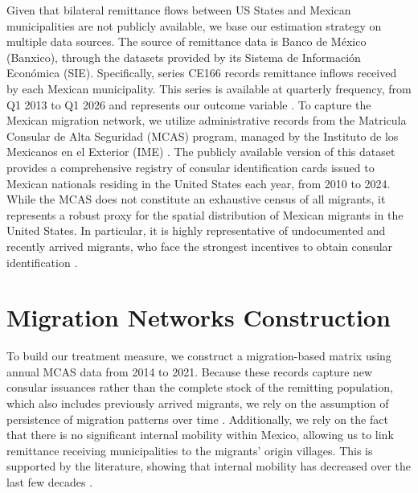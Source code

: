 Given that bilateral remittance flows between US States and Mexican municipalities are not publicly available, we base our estimation strategy on multiple data sources. The source of remittance data is Banco de México (Banxico), through the datasets provided by its Sistema de Información Económica (SIE). Specifically, series CE166 records remittance inflows received by each Mexican municipality. This series is available at quarterly frequency, from Q1 2013 to Q1 2026 and represents our outcome variable \parencite{banxico_ce166}. To capture the Mexican migration network, we utilize administrative records from the Matricula Consular de Alta Seguridad (MCAS) program, managed by the Instituto de los Mexicanos en el Exterior (IME) \parencite{ime_estadisticas_2026}. The publicly available version of this dataset provides a comprehensive registry of consular identification cards issued to Mexican nationals residing in the United States each year, from 2010 to 2024. While the MCAS does not constitute an exhaustive census of all migrants, it represents a robust proxy for the spatial distribution of Mexican migrants in the United States. In particular, it is highly representative of undocumented and recently arrived migrants, who face the strongest incentives to obtain consular identification \parencite{caballero_cadena_kovak_2018}. 

\section{Migration Networks Construction} \label{sec:migration-network-construction}

To build our treatment measure, we construct a migration-based matrix using annual MCAS data from 2014 to 2021. Because these records capture new consular issuances rather than the complete stock of the remitting population, which also includes previously arrived migrants, we rely on the assumption of persistence of migration patterns over time \parencite{card2001, munshi2003}. Additionally, we rely on the fact that there is no significant internal mobility within Mexico, allowing us to link remittance receiving municipalities to the migrants' origin villages. This is supported by the literature, showing that internal mobility has decreased over the last few decades \parencite{gordillo2017movilidad,partida2014migracion}. 

\par

